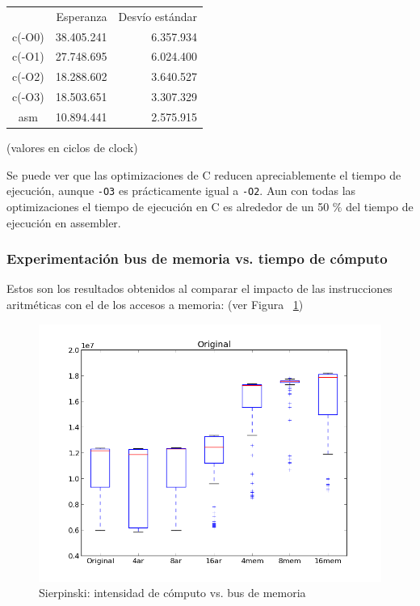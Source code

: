 \documentclass[a4paper]{article}
\begin{document}
\begin{tabular}{c|r|r} %
 & Esperanza & Desvío estándar \\
 c(-O0) & 38.405.241 & 6.357.934 \\
 c(-O1) & 27.748.695 & 6.024.400 \\
 c(-O2) & 18.288.602 & 3.640.527 \\
 c(-O3) & 18.503.651 & 3.307.329 \\
 asm & 10.894.441 & 2.575.915
\end{tabular}
(valores en ciclos de clock)

\smallskip
Se puede ver que las optimizaciones de C reducen apreciablemente el tiempo de ejecución, aunque \texttt{-O3} es prácticamente igual a \texttt{-O2}. Aun con todas las optimizaciones el tiempo de ejecución en C es alrededor de un 50 $\%$ del tiempo de ejecución en assembler. %

\subsubsection{Experimentación bus de memoria vs. tiempo de cómputo}

Estos son los resultados obtenidos al comparar el impacto de las instrucciones aritméticas con el de los accesos a memoria: (ver Figura ~\ref{fig:graficos_sierpinski2})

\begin{figure}[htbp]
\centering
\includegraphics[scale=0.5]{imagenes/arvsmemsierpinski.png}
\caption{Sierpinski: intensidad de cómputo vs. bus de memoria}
\label{fig:graficos_sierpinski2}
\end{figure}
\end{document}
